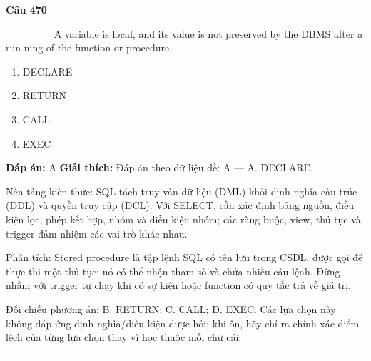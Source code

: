 \documentclass[11pt,a4paper]{article}
\newenvironment{question}[1]{%
  \par\vspace{1em}\noindent\textbf{\large Câu #1}\par\vspace{0.4em}
}{%
  \par\vspace{1em}\hrule\vspace{0.6em}
}
\newenvironment{choices}{%
  \begin{enumerate}[label=\textbf{\Alph*.},leftmargin=2.2em,itemsep=2pt,topsep=3pt]
}{%
  \end{enumerate}
}
\newcommand{\choice}{\item}
\begin{document}
\begin{question}{470}
______ A variable is local, and its value is not preserved by the DBMS after a run-ning of the function or
procedure.
\begin{choices}
\choice DECLARE
\choice RETURN
\choice CALL
\choice EXEC
\end{choices}
\textbf{Đáp án:} A
\textbf{Giải thích:} Đáp án theo dữ liệu đề: A — A. DECLARE.

Nền tảng kiến thức: SQL tách truy vấn dữ liệu (DML) khỏi định nghĩa cấu trúc (DDL) và quyền truy cập (DCL). Với SELECT, cần xác định bảng nguồn, điều kiện lọc, phép kết hợp, nhóm và điều kiện nhóm; các ràng buộc, view, thủ tục và trigger đảm nhiệm các vai trò khác nhau.

Phân tích: Stored procedure là tập lệnh SQL có tên lưu trong CSDL, được gọi để thực thi một thủ tục; nó có thể nhận tham số và chứa nhiều câu lệnh. Đừng nhầm với trigger tự chạy khi có sự kiện hoặc function có quy tắc trả về giá trị.

Đối chiếu phương án: B. RETURN; C. CALL; D. EXEC. Các lựa chọn này không đáp ứng định nghĩa/điều kiện được hỏi; khi ôn, hãy chỉ ra chính xác điểm lệch của từng lựa chọn thay vì học thuộc mỗi chữ cái.
\end{question}
\end{document}

